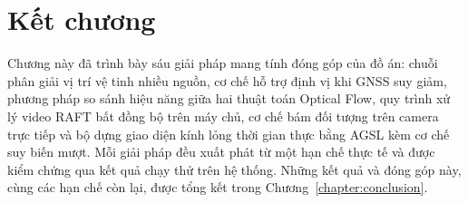 \documentclass[../DoAn.tex]{subfiles}
\begin{document}
\section*{Kết chương}
Chương này đã trình bày sáu giải pháp mang tính đóng góp của đồ án: chuỗi phân giải vị trí vệ tinh nhiều nguồn, cơ chế hỗ trợ định vị khi GNSS suy giảm, phương pháp so sánh hiệu năng giữa hai thuật toán Optical Flow, quy trình xử lý video RAFT bất đồng bộ trên máy chủ, cơ chế bám đối tượng trên camera trực tiếp và bộ dựng giao diện kính lỏng thời gian thực bằng AGSL kèm cơ chế suy biến mượt. Mỗi giải pháp đều xuất phát từ một hạn chế thực tế và được kiểm chứng qua kết quả chạy thử trên hệ thống. Những kết quả và đóng góp này, cùng các hạn chế còn lại, được tổng kết trong Chương~\ref{chapter:conclusion}.
\end{document}
